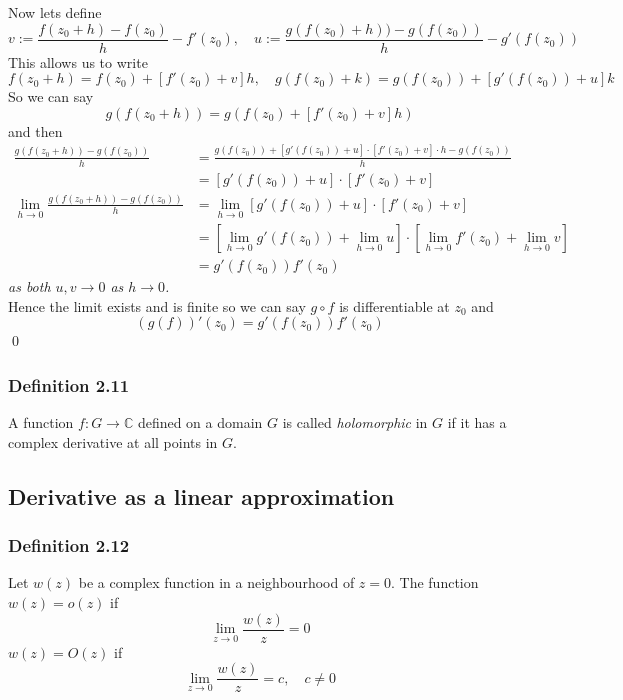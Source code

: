 \documentclass[a4paper, 12pt, twoside]{article}
\begin{document}
\begin{itemize}
Now lets define
$$v:= \frac{f(z_{0}+h)-f(z_{0})}{h}-f'(z_{0}), \quad
u:=\frac{g(f(z_{0})+h))-g(f(z_{0}))}{h} -g'(f(z_{0}))$$
This allows us to write
$$f(z_{0}+h)=f(z_{0})+[f'(z_{0})+v]h,\quad g(f(z_{0})+k)=g(f(z_{0}))+[g'(f(z_{0}))+u]k $$
So we can say
$$g(f(z_{0}+h))= g(f(z_{0})+[f'(z_{0})+v]h)$$
and then
\begin{align*}
    \frac{g(f(z_{0}+h))-g(f(z_{0}))}{h} &= \frac{g(f(z_{0}))+[g'(f(z_{0}))+u]\cdot[f'(z_{0})+v]\cdot h- g(f(z_{0}))}{h}\\
    &=[g'(f(z_{0}))+u]\cdot[f'(z_{0})+v]\\
    \lim_{h\to0}\frac{g(f(z_{0}+h))-g(f(z_{0}))}{h} &=
    \lim_{h\to0}[g'(f(z_{0}))+u]\cdot[f'(z_{0})+v]\\
    &=[\lim_{h\to0}g'(f(z_{0}))+\lim_{h\to0}u]\cdot[\lim_{h\to0}f'(z_{0})+\lim_{h\to0}v]\\
    &=g'(f(z_{0}))f'(z_{0})
\end{align*}
\textit{as both $u,v\to 0 $ as $h\to 0$.}\\
Hence the limit exists and is finite so we can say $g\circ f$ is differentiable at $z_{0}$ and
$$(g(f))'(z_{0})=g'(f(z_{0}))f'(z_{0}) $$\qed
\end{itemize}
\subsubsection*{Definition 2.11}
A function $f:G \to  \mathbb{C}$ defined on a domain $G$ is called \emph{holomorphic} in $G$ if it has a complex derivative at all points in $G$.

\newpage
\subsection{Derivative as a linear approximation}
\subsubsection*{Definition 2.12}
Let $w(z)$ be a complex function in a neighbourhood of $z=0$. The function $w(z)=o(z)$ if
$$\lim_{z\to0}\frac{w(z)}{z}=0$$
$w(z)=O(z)$ if
$$\lim_{z\to0}\frac{w(z)}{z}=c,\quad c\neq 0$$
\end{document}
